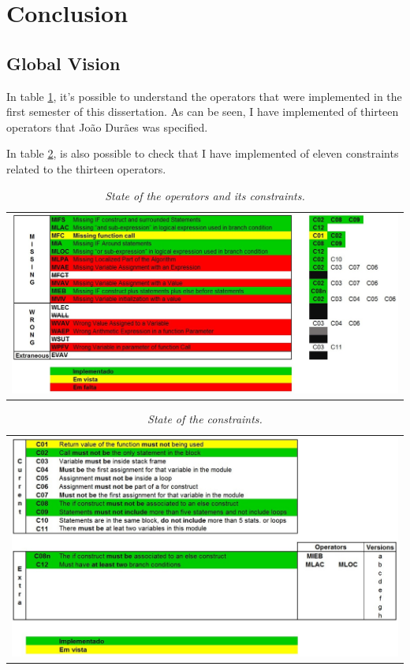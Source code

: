 \clearpage
\section{Conclusion}

\subsection{Global Vision}

In table \ref{tab:operators_status}, it's possible to understand the operators that were implemented in the first semester of this dissertation. As can be seen, I have implemented  of thirteen operators that João Durães was specified.

In table \ref{tab:constraints_status}, is also possible to check that I have implemented  of eleven constraints related to the thirteen operators.

\begin{table}[ht]
\begin{tabular}{c}
\includegraphics[width=1.1\textwidth]{img/operators_status.jpg}
\end{tabular}
\caption{\small \sl State of the operators and its constraints.\label{tab:operators_status}}
\end{table}



\begin{table}[ht]
\begin{tabular}{c}
\includegraphics[width=1.1\textwidth]{img/constraints_status.jpg}
\end{tabular}
\caption{\small \sl State of the constraints.\label{tab:constraints_status}}
\end{table}

